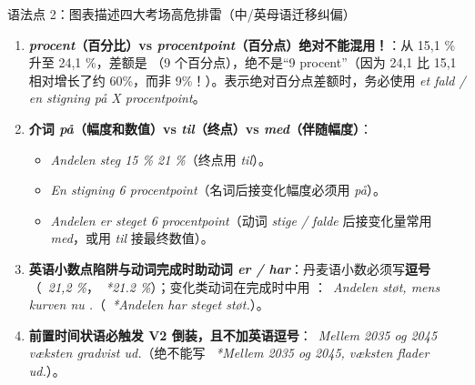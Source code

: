\begin{grammatikbox}{语法点 2：图表描述四大考场高危排雷（中/英母语迁移纠偏）}
\begin{enumerate}
  \item \textbf{\textit{procent}（百分比）vs \textit{procentpoint}（百分点）绝对不能混用！}：从 15,1 \% 升至 24,1 \%，差额是 （9 个百分点），绝不是“9 procent”（因为 24,1 比 15,1 相对增长了约 60\%，而非 9\%！）。表示绝对百分点差额时，务必使用 \textit{et fald / en stigning på X procentpoint}。
  \item \textbf{介词 \textit{på}（幅度和数值）vs \textit{til}（终点）vs \textit{med}（伴随幅度）}：
    \begin{itemize}
      \item \textit{Andelen steg  15 \%  21 \%}（终点用 \textit{til}）。
      \item \textit{En stigning  6 procentpoint}（名词后接变化幅度必须用 \textit{på}）。
      \item \textit{Andelen er steget  6 procentpoint}（动词 \textit{stige / falde} 后接变化量常用 \textit{med}，或用 \textit{til} 接最终数值）。
    \end{itemize}
  \item \textbf{英语小数点陷阱与动词完成时助动词 \textit{er / har}}：丹麦语小数必须写\textbf{逗号}（\ \textit{21,2 \%}，\ \textit{*21.2 \%}）；变化类动词在完成时中用 ：\ \textit{Andelen  støt, mens kurven nu .}（\ \textit{*Andelen har steget støt.}）。
  \item \textbf{前置时间状语必触发 V2 倒装，且不加英语逗号}：\ \textit{Mellem 2035 og 2045  væksten gradvist ud.}（绝不能写 \ \textit{*Mellem 2035 og 2045, væksten flader ud.}）。
\end{enumerate}
\end{grammatikbox}


